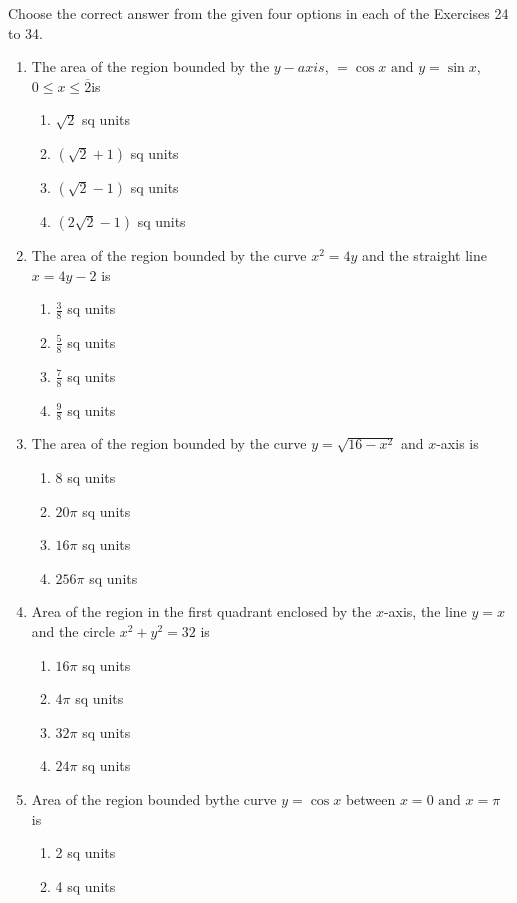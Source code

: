\documentclass[12pt]{article}
\begin{document}
Choose the correct answer from the given four options in each of the Exercises 24 to 34.
\begin{enumerate}[resume]
\item The area of the region bounded by the $y - axis$, $ = \cos x\text{ and }y = \sin x$, $0 \leqslant x \leqslant \overline{2} $is
\begin{enumerate}
\item $\sqrt{2}$ sq units
\item $(\sqrt{2} + 1)$ sq units
\item $(\sqrt{2} - 1)$ sq units 
\item $(2\sqrt{2} - 1)$ sq units
\end{enumerate}
\item The area of the region bounded by the curve $x^2 = 4y$ and the straight line $x = 4y - 2$ is
\begin{enumerate}
\item $\frac{3}{8}$ sq units 
\item $\frac{5}{8}$ sq units
\item $\frac{7}{8}$ sq units 
\item $\frac{9}{8}$ sq units
\end{enumerate}
\item The area of the region bounded by the curve $y = \sqrt{16 - x^2}$ and $x$-axis is 
\begin{enumerate}
\item 8 sq units 
\item ${20\pi}$ sq units
\item ${16\pi}$ sq units
\item ${256\pi}$ sq units
\end{enumerate}
\item Area of the region in the first quadrant enclosed by the $x$-axis, the line $y = x$ and the circle $x^2 + y^2 = 32$ is 
\begin{enumerate}
\item ${16\pi}$ sq units 
\item ${4\pi}$ sq units
\item ${32\pi}$ sq units
\item ${24\pi}$ sq units
\end{enumerate}
\item Area of the region bounded bythe curve $y = \cos x$ between $x = 0\text{ and }{x =\pi}$ is 
\begin{enumerate}
\item 2 sq units
\item 4 sq units

\end{enumerate}
\end{enumerate}
\end{document}
